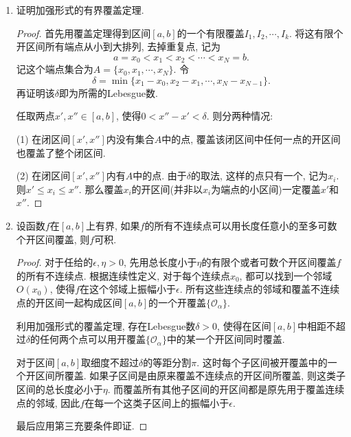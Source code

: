 \documentclass[UTF8,11pt, a4paper, oneside, fontset=none]{ctexbook}
\begin{document}
\begin{enumerate}


\item 证明加强形式的有界覆盖定理.


\begin{proof}

首先用覆盖定理得到区间$[a, b]$的一个有限覆盖$I_1, I_2, \cdots, I_k$. 将这有限个开区间所有端点从小到大排列, 去掉重复点, 记为
\[
a = x_0 < x_1 < x_2 < \cdots < x_N =b.
\]
记这个端点集合为$A = \{x_0, x_1, \cdots, x_N \}$. 令
\[
\delta = \min \{ x_1 - x_0, x_2 - x_1, \cdots, x_N - x_{N-1} \}.
\]
再证明该$\delta$即为所需的Lebesgue数.


任取两点$x', x'' \in [a, b]$, 使得$0 < x'' - x ' < \delta$. 则分两种情况:

(1) 在闭区间$[x', x'']$内没有集合$A$中的点, 覆盖该闭区间中任何一点的开区间也覆盖了整个闭区间.


(2) 在闭区间$[x', x'']$内有$A$中的点. 由于$\delta$的取法, 这样的点只有一个, 记为$x_i$. 则$x' \leq x_i \leq x''$. 那么覆盖$x_i$的开区间(并非以$x_i$为端点的小区间)一定覆盖$x'$和$x''$.


\end{proof}

\item 设函数$f$在$[a, b]$上有界, 如果$f$的所有不连续点可以用长度任意小的至多可数个开区间覆盖, 则$f$可积.


\begin{proof}

对于任给的$\epsilon, \eta > 0$, 先用总长度小于$\eta$的有限个或者可数个开区间覆盖$f$的所有不连续点. 根据连续性定义, 对于每个连续点$x_0$, 都可以找到一个邻域$O(x_0)$, 使得$f$在这个邻域上振幅小于$\epsilon$. 所有这些连续点的邻域和覆盖不连续点的开区间一起构成区间$[a, b]$的一个开覆盖$\{\mathcal O_{\alpha} \}$.


利用加强形式的覆盖定理, 存在Lebesgue数$\delta >0$, 使得在区间$[a, b]$中相距不超过$\delta$的任何两个点可以用开覆盖$\{\mathcal O_{\alpha} \}$中的某一个开区间同时覆盖.


对于区间$[a, b]$取细度不超过$\delta$的等距分割$\pi$. 这时每个子区间被开覆盖中的一个开区间所覆盖. 如果子区间是由原来覆盖不连续点的开区间所覆盖, 则这类子区间的总长度必小于$\eta$. 而覆盖所有其他子区间的开区间都是原先用于覆盖连续点的邻域, 因此$f$在每一个这类子区间上的振幅小于$\epsilon$.


最后应用第三充要条件即证.


\end{proof}




\end{enumerate}
\end{document}
